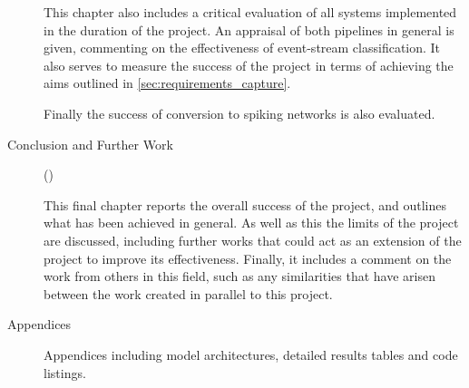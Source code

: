 \begin{description}
      This chapter also includes a critical evaluation of all systems implemented in the duration of the project. An appraisal of both pipelines in general is given, commenting on the effectiveness of event-stream classification. It also serves to measure the success of the project in terms of achieving the aims outlined in \cref{sec:requirements_capture}.

      Finally the success of conversion to spiking networks is also evaluated.
      
      \item[Conclusion and Further Work] ()
      
      This final chapter reports the overall success of the project, and outlines what has been achieved in general. As well as this the limits of the project are discussed, including further works that could act as an extension of the project to improve its effectiveness. Finally, it includes a comment on the work from others in this field, such as any similarities that have arisen between the work created in parallel to this project.
      
      \item[Appendices]
      Appendices including model architectures, detailed results tables and code listings.
\end{description}